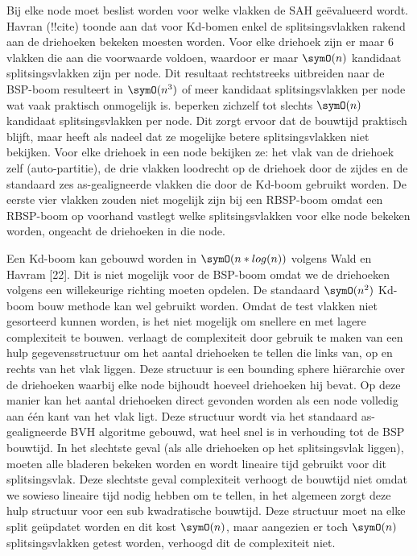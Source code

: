 Bij elke node moet beslist worden voor welke vlakken de SAH geëvalueerd wordt. Havran (!!cite) toonde aan dat voor Kd-bomen enkel de splitsingsvlakken rakend aan de driehoeken bekeken moesten worden.
Voor elke driehoek zijn er maar 6 vlakken die aan die voorwaarde voldoen, waardoor er maar $\symO(n)$ kandidaat splitsingsvlakken zijn per node.
Dit resultaat rechtstreeks uitbreiden naar de BSP-boom resulteert in $\symO(n^3)$ of meer kandidaat splitsingsvlakken per node wat vaak praktisch onmogelijk is. 
\authorIze{ }beperken zichzelf tot slechts $\symO(n)$ kandidaat splitsingsvlakken per node. 
Dit zorgt ervoor dat de bouwtijd praktisch blijft, maar heeft als nadeel dat ze mogelijke betere splitsingsvlakken niet bekijken.
Voor elke driehoek in een node bekijken ze: het vlak van de driehoek zelf (auto-partitie), de drie vlakken loodrecht op de driehoek door de zijdes en de standaard zes as-gealigneerde vlakken die door de Kd-boom gebruikt worden.
De eerste vier vlakken zouden niet mogelijk zijn bij een RBSP-boom omdat een RBSP-boom op voorhand vastlegt welke splitsingsvlakken voor elke node bekeken worden, ongeacht de driehoeken in die node.

Een Kd-boom kan gebouwd worden in $\symO(n*log(n))$ volgens Wald en Havram [22].
Dit is niet mogelijk voor de BSP-boom omdat we de driehoeken volgens een willekeurige richting moeten opdelen.
De standaard $\symO(n^2)$ Kd-boom bouw methode kan wel gebruikt worden.
Omdat de test vlakken niet gesorteerd kunnen worden, is het niet mogelijk om snellere en met lagere complexiteit te bouwen.
\authorIze{ }verlaagt de complexiteit door gebruik te maken van een hulp gegevensstructuur om het aantal driehoeken te tellen die links van, op en rechts van het vlak liggen.
Deze structuur is een bounding sphere hiërarchie over de driehoeken waarbij elke node bijhoudt hoeveel driehoeken hij bevat. 
Op deze manier kan het aantal driehoeken direct gevonden worden als een node volledig aan één kant van het vlak ligt.
Deze structuur wordt via het standaard as-gealigneerde BVH algoritme gebouwd, wat heel snel is in verhouding tot de BSP bouwtijd.
In het slechtste geval (als alle driehoeken op het splitsingsvlak liggen), moeten alle bladeren bekeken worden en wordt lineaire tijd gebruikt voor dit splitsingsvlak. 
Deze slechtste geval complexiteit verhoogt de bouwtijd niet omdat we sowieso lineaire tijd nodig hebben om te tellen, in het algemeen zorgt deze hulp structuur voor een sub kwadratische bouwtijd.
Deze structuur moet na elke split geüpdatet worden en dit kost $\symO(n)$, maar aangezien er toch $\symO(n)$ splitsingsvlakken getest worden, verhoogd dit de complexiteit niet. 

